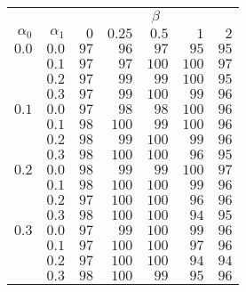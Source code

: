 \begin{tabular}{rr|rrrrr}
\hline\hline
 && \multicolumn{5}{c}{$\beta$}\\
 $\alpha_0$ & $\alpha_1$ & $0$ & $0.25$ & $0.5$ & $1$ & $2$ \\ 
 \hline
$0.0$ & $0.0$ & $97$ & $96$ & $97$ & $95$ & $95$\\ 
 & $0.1$ & $97$ & $97$ & $100$ & $100$ & $97$\\ 
 & $0.2$ & $97$ & $99$ & $99$ & $100$ & $95$\\ 
 & $0.3$ & $97$ & $99$ & $100$ & $99$ & $96$\\ 
\hline 
 $0.1$ & $0.0$ & $97$ & $98$ & $98$ & $100$ & $96$\\ 
 & $0.1$ & $98$ & $100$ & $99$ & $100$ & $96$\\ 
 & $0.2$ & $98$ & $99$ & $100$ & $99$ & $96$\\ 
 & $0.3$ & $98$ & $100$ & $100$ & $96$ & $95$\\ 
\hline 
 $0.2$ & $0.0$ & $98$ & $99$ & $99$ & $100$ & $97$\\ 
 & $0.1$ & $98$ & $100$ & $100$ & $99$ & $96$\\ 
 & $0.2$ & $97$ & $100$ & $100$ & $96$ & $96$\\ 
 & $0.3$ & $98$ & $100$ & $100$ & $94$ & $95$\\ 
\hline 
 $0.3$ & $0.0$ & $97$ & $99$ & $100$ & $99$ & $96$\\ 
 & $0.1$ & $97$ & $100$ & $100$ & $97$ & $96$\\ 
 & $0.2$ & $97$ & $100$ & $100$ & $94$ & $94$\\ 
 & $0.3$ & $98$ & $100$ & $99$ & $95$ & $96$\\ 
 \hline 
 \end{tabular}